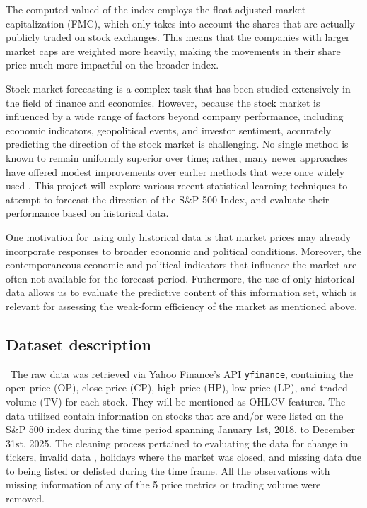 \documentclass[11pt]{article}
\begin{document}
The computed valued of the index employs the float-adjusted market capitalization (FMC), which only takes into account the shares that are actually publicly traded on stock exchanges. This means that the companies with larger market caps are weighted more heavily, making the movements in their share price much more impactful on the broader index.

Stock market forecasting is a complex task that has been studied extensively in the field of finance and economics. However, because the stock market is influenced by a wide range of factors beyond company performance, including economic indicators, geopolitical events, and investor sentiment, accurately predicting the direction of the stock market is challenging. No single method is known to remain uniformly superior over time; rather, many newer approaches have offered modest improvements over earlier methods that were once widely used \cite{KUMBURE_2022}. This project will explore various recent statistical learning techniques to attempt to forecast the direction of the S\&P 500 Index, and evaluate their performance based on historical data.

One motivation for using only historical data is that market prices may already incorporate responses to broader economic and political conditions. Moreover, the contemporaneous economic and political indicators that influence the market are often not available for the forecast period. Futhermore, the use of only historical data allows us to evaluate the predictive content of this information set, which is relevant for assessing the weak-form efficiency of the market as mentioned above.

\subsection{Dataset description}


\quad \ The raw data was retrieved via Yahoo Finance's API \verb|yfinance|, containing the open price (OP), close price (CP), high price (HP), low price (LP), and traded volume (TV) for each stock. They will be mentioned as OHLCV features. The data utilized contain information on stocks that are and/or were listed on the S\&P 500 index during the time period spanning January 1st, 2018, to December 31st, 2025. The cleaning process pertained to evaluating the data for change in tickers, invalid data , holidays where the market was closed, and missing data due to being listed or delisted during the time frame. All the observations with missing information of any of the 5 price metrics or trading volume were removed.
\end{document}
